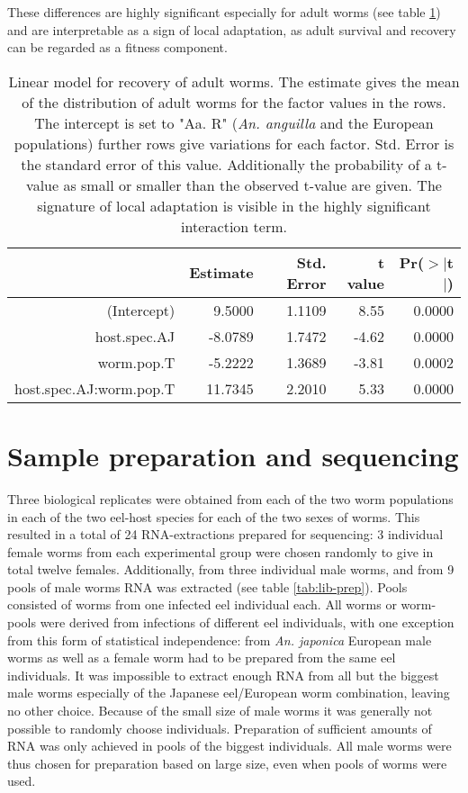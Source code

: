 These differences are highly significant especially for adult worms
(see table \ref{tab:ad-sig}) and are interpretable as a sign of local
adaptation, as adult survival and recovery can be regarded as a
fitness component.


\begin{table}[h]
\begin{center}
\begin{tabular}{rrrrr}
  \hline
 & Estimate & Std. Error & t value & Pr($>$$|$t$|$) \\ 
  \hline
  (Intercept) & 9.5000 & 1.1109 & 8.55 & 0.0000 \\ 
  host.spec.AJ & -8.0789 & 1.7472 & -4.62 & 0.0000 \\ 
  worm.pop.T & -5.2222 & 1.3689 & -3.81 & 0.0002 \\ 
  host.spec.AJ:worm.pop.T & 11.7345 & 2.2010 & 5.33 & 0.0000 \\ 
   \hline
\end{tabular}
\caption[Linear model for recovery]{Linear model for recovery of adult
  worms. The estimate gives the mean of the distribution of adult
  worms for the factor values in the rows. The intercept is set to
  "Aa. R" (\textit{An. anguilla} and the European populations) further
  rows give variations for each factor. Std. Error is the standard
  error of this value. Additionally the probability of a t-value as
  small or smaller than the observed t-value are given. The signature
  of local adaptation is visible in the highly significant interaction
  term.}
\label{tab:ad-sig}
\end{center}
\end{table}

\afterpage{\clearpage}




\section{Sample preparation and sequencing }

Three biological replicates were obtained from each of the two worm
populations in each of the two eel-host species for each of the two
sexes of worms. This resulted in a total of 24 RNA-extractions
prepared for sequencing: 3 individual female worms from each
experimental group were chosen randomly to give in total twelve
females. Additionally, from three individual male worms, and from 9
pools of male worms RNA was extracted (see table
\ref{tab:lib-prep}). Pools consisted of worms from one infected eel
individual each. All worms or worm-pools were derived from infections
of different eel individuals, with one exception from this form of
statistical independence: from \textit{An. japonica} European male
worms as well as a female worm had to be prepared from the same eel
individuals. It was impossible to extract enough RNA from all but the
biggest male worms especially of the Japanese eel/European worm
combination, leaving no other choice. Because of the small size of
male worms it was generally not possible to randomly choose
individuals. Preparation of sufficient amounts of RNA was only
achieved in pools of the biggest individuals. All male worms were thus
chosen for preparation based on large size, even when pools of worms
were used.

